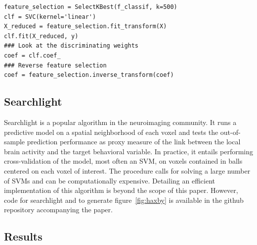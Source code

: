 \documentclass{frontiersSCNS} %
\begin{document}
\begin{lstlisting}
feature_selection = SelectKBest(f_classif, k=500)
clf = SVC(kernel='linear')
X_reduced = feature_selection.fit_transform(X)
clf.fit(X_reduced, y)
### Look at the discriminating weights
coef = clf.coef_
### Reverse feature selection
coef = feature_selection.inverse_transform(coef)
\end{lstlisting}

\subsection{Searchlight}
\label{searchlight}

Searchlight \citep{kriegeskorte2006} is a popular algorithm in the
neuroimaging community. It runs a predictive model on a spatial
neighborhood of each voxel and tests the out-of-sample prediction
performance as proxy measure of the link between the local brain activity
and the target behavioral variable. In practice, it entails performing
cross-validation of the model, most often an SVM, on voxels contained in
balls centered on each voxel of interest. The procedure calls for 
solving a large number of SVMs and can be computationally expensive.
Detailing an efficient implementation of this algorithm is beyond the
scope of this paper. However, code for searchlight and to generate
figure~\ref{fig:haxby}
is available in the github repository accompanying the paper.

\subsection{Results}
\end{document}
